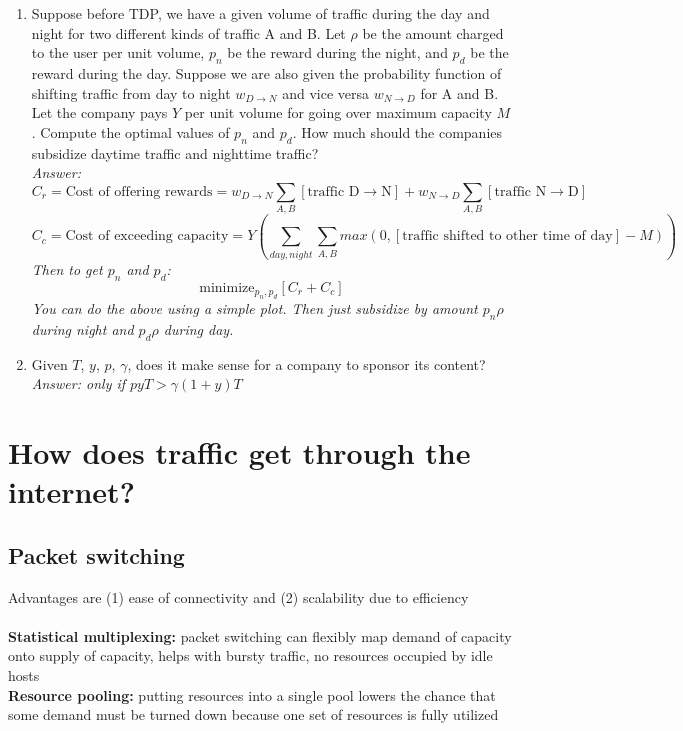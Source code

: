 \documentclass{article}
\begin{document}
\begin{enumerate}
\item Suppose before TDP, we have a given volume of traffic during the day and night for two different kinds of traffic A and B. Let $\rho$ be the amount charged to the user per unit volume, $p_n$ be the reward during the night, and $p_d$ be the reward during the day. Suppose we are also given the probability function of shifting traffic from day to night $w_{D \to N}$ and vice versa $w_{N \to D}$ for A and B. Let the company pays $Y$ per unit volume for going over maximum capacity $M$. Compute the optimal values of $p_n$ and $p_d$. How much should the companies subsidize daytime traffic and nighttime traffic? \\
\textit{Answer:
$$ C_r = \text{Cost of offering rewards} = w_{D \to N} \sum_{A,B} [\text{traffic D} \to \text{N}] + w_{N \to D} \sum_{A,B} [\text{traffic N} \to \text{D}] $$
$$ C_c = \text{Cost of exceeding capacity} = Y \left( \sum_{day, night} \sum_{A,B} max(0,[\text{traffic shifted to other time of day}] - M) \right) $$
Then to get $p_n$ and $p_d$:
$$ \text{minimize}_{p_n, p_d}[C_r + C_c] $$
You can do the above using a simple plot. Then just subsidize by amount $p_n \rho$ during night and $p_d \rho$ during day.
}
\item Given $T$, $y$, $p$, $\gamma$, does it make sense for a company to sponsor its content? \\
\textit{Answer: only if $pyT > \gamma(1+y)T$}
\end{enumerate}

\section{How does traffic get through the internet?}

\subsection{Packet switching}

Advantages are (1) ease of connectivity and (2) scalability due to efficiency\\
\\
\textbf{Statistical multiplexing:} packet switching can flexibly map demand of capacity onto supply of capacity, helps with bursty traffic, no resources occupied by idle hosts \\
\textbf{Resource pooling:} putting resources into a single pool lowers the chance that some demand must be turned down because one set of resources is fully utilized
\end{document}
